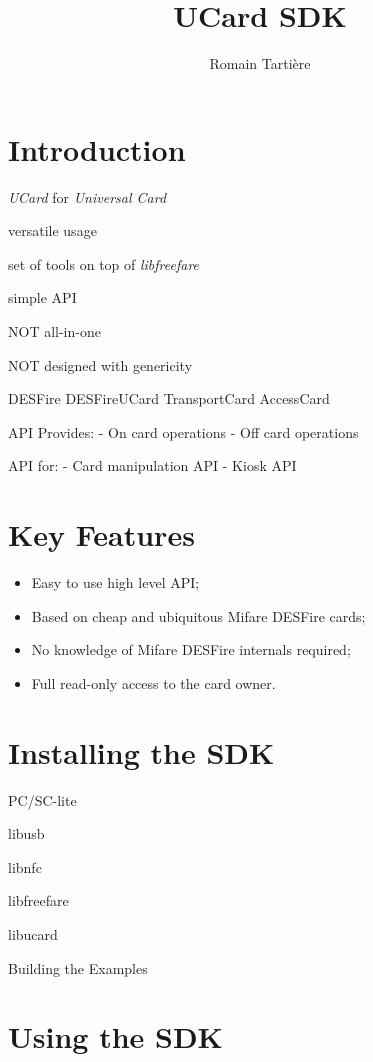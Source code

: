 \documentclass{article}
\title{UCard SDK}
\author{Romain Tartière}
\begin{document}
\maketitle

\tableofcontents

\section{Introduction}

\emph{UCard} for \emph{Universal Card}

versatile usage

set of tools on top of \emph{libfreefare} \cite{libfreefare}

simple API

NOT all-in-one

NOT designed with genericity

DESFire
DESFireUCard
TransportCard
AccessCard

API Provides:
  - On card operations
	- Off card operations

API for:
  - Card manipulation API
	- Kiosk API

\section{Key Features}

\begin{itemize}
  \item Easy to use high level API;
	\item Based on cheap and ubiquitous Mifare DESFire cards;
	\item No knowledge of Mifare DESFire internals required;
  \item Full read-only access to the card owner.
\end{itemize}

\section{Installing the SDK}

PC/SC-lite

libusb

libnfc \cite{libnfc}

libfreefare \cite{libfreefare}

libucard

Building the Examples

\section{Using the SDK}
\end{document}
